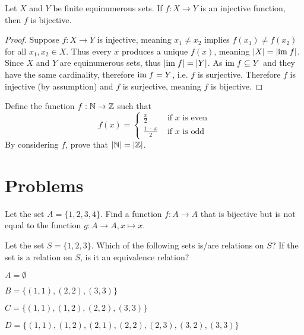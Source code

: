 \begin{proposition}
    Let $X$ and $Y$ be finite equinumerous sets. If $f: X \to Y$ is an injective function, then $f$ is bijective.
\end{proposition}
\begin{proof}
    Suppose $f: X \to Y$ is injective, meaning $x_1 \neq x_2$ implies $f(x_1) \neq f(x_2)$ for all $x_1, x_2 \in X$. Thus every $x$ produces a unique $f(x)$, meaning $|X| = |\mathrm{im}\; f|$. Since $X$ and $Y$ are equinumerous sets, thus $|\mathrm{im}\; f| = |Y|$. As $\mathrm{im}\; f \subseteq Y$ and they have the same cardinality, therefore $\mathrm{im}\; f = Y$, i.e. $f$ is surjective. Therefore $f$ is injective (by assumption) and $f$ is surjective, meaning $f$ is bijective.
\end{proof}

\begin{exercise}
    Define the function $f: \mathbb{N} \to \mathbb{Z}$ such that
    \[
        f(x) = \begin{cases}
            \frac{x}{2} & \text{ if } x \text{ is even}\\
            \frac{1-x}{2} & \text{ if } x \text{ is odd}
        \end{cases}
    \]
    By considering $f$, prove that $|\mathbb{N}| = |\mathbb{Z}|$.
\end{exercise}

\newpage

\section{Problems}
\begin{problem}
    Let the set $A = \{1, 2, 3, 4\}$. Find a function $f: A \to A$ that is bijective but is not equal to the function $g: A \to A, x \mapsto x$.
\end{problem}

\begin{problem}
    Let the set $S = \{1, 2, 3\}$. Which of the following sets is/are relations on $S$? If the set is a relation on $S$, is it an equivalence relation?
    \begin{partquestions}{\alph*}
        \item $A = \emptyset$
        \item $B = \{(1, 1), (2, 2), (3, 3)\}$
        \item $C = \{(1, 1), (1, 2), (2, 2), (3, 3)\}$
        \item $D = \{(1, 1), (1, 2), (2, 1), (2, 2), (2, 3), (3, 2), (3, 3)\}$
    \end{partquestions}
\end{problem}

